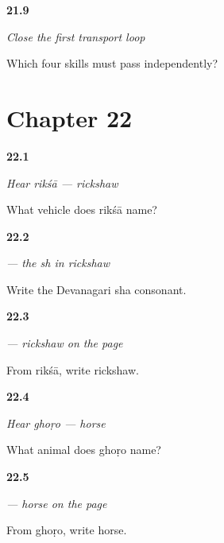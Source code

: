 \noindent\begin{minipage}[t]{\linewidth}
\raggedright
\hypertarget{review-MW-R16-transport-close-recall}{\textbf{21.9}} \emph{Close the first transport loop}\par
\small Which four skills must pass independently?
\end{minipage}\par\medskip

\section*{Chapter 22}

\noindent\begin{minipage}[t]{\linewidth}
\raggedright
\hypertarget{review-MW-C17-hear-riksha-meaning}{\textbf{22.1}} \emph{Hear \emph{rikśā} — rickshaw}\par
\small What vehicle does rikśā name?
\end{minipage}\par\medskip

\noindent\begin{minipage}[t]{\linewidth}
\raggedright
\hypertarget{review-MW-W17-sha-write}{\textbf{22.2}} \emph{ — the \emph{sh} in rickshaw}\par
\small Write the Devanagari sha consonant.
\end{minipage}\par\medskip

\noindent\begin{minipage}[t]{\linewidth}
\raggedright
\hypertarget{review-MW-C17-riksha-dictation}{\textbf{22.3}} \emph{ — rickshaw on the page}\par
\small From rikśā, write rickshaw.
\end{minipage}\par\medskip

\noindent\begin{minipage}[t]{\linewidth}
\raggedright
\hypertarget{review-MW-C17-hear-ghodo-meaning}{\textbf{22.4}} \emph{Hear \emph{ghoṛo} — horse}\par
\small What animal does ghoṛo name?
\end{minipage}\par\medskip

\noindent\begin{minipage}[t]{\linewidth}
\raggedright
\hypertarget{review-MW-C17-ghodo-dictation}{\textbf{22.5}} \emph{ — horse on the page}\par
\small From ghoṛo, write horse.
\end{minipage}\par\medskip

